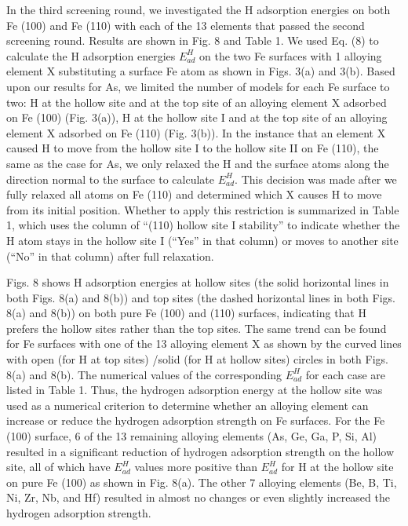 In the third screening round, we investigated the H adsorption energies on both Fe (100) and Fe (110) with each of the 13 elements that passed the second screening round. Results are shown in Fig. 8 and Table 1. We used Eq. (8) to calculate the H adsorption energies $E_{ad}^H$ on the two Fe surfaces with 1 alloying element X substituting a surface Fe atom as shown in Figs. 3(a) and 3(b). Based upon our results for As, we limited the number of models for each Fe surface to two: H at the hollow site and at the top site of an alloying element X adsorbed on Fe (100) (Fig. 3(a)), H at the hollow site I and at the top site of an alloying element X adsorbed on Fe (110) (Fig. 3(b)). In the instance that an element X caused H to move from the hollow site I to the hollow site II on Fe (110), the same as the case for As, we only relaxed the H and the surface atoms along the direction normal to the surface to calculate $E_{ad}^H$. This decision was made after we fully relaxed all atoms on Fe (110) and determined which X causes H to move from its initial position. Whether to apply this restriction is summarized in Table 1, which uses the column of “(110) hollow site I stability” to indicate whether the H atom stays in the hollow site I (“Yes” in that column) or moves to another site (“No” in that column) after full relaxation.

Figs. 8 shows H adsorption energies at hollow sites (the solid horizontal lines in both Figs. 8(a) and 8(b)) and top sites (the dashed horizontal lines in both Figs. 8(a) and 8(b)) on both pure Fe (100) and (110) surfaces, indicating that H prefers the hollow sites rather than the top sites. The same trend can be found for Fe surfaces with one of the 13 alloying element X as shown by the curved lines with open (for H at top sites) /solid (for H at hollow sites) circles in both Figs. 8(a) and 8(b).  The numerical values of the corresponding $E_{ad}^H$ for each case are listed in Table 1. Thus, the hydrogen adsorption energy at the hollow site was used as a numerical criterion to determine whether an alloying element can increase or reduce the hydrogen adsorption strength on Fe surfaces. For the Fe (100) surface, 6 of the 13 remaining alloying elements (As, Ge, Ga, P, Si, Al) resulted in a significant reduction of hydrogen adsorption strength on the hollow site, all of which have $E_{ad}^H$ values more positive than $E_{ad}^H$ for H at the hollow site on pure Fe (100) as shown in Fig. 8(a). The other 7 alloying elements (Be, B, Ti, Ni, Zr, Nb, and Hf) resulted in almost no changes or even slightly increased the hydrogen adsorption strength.

